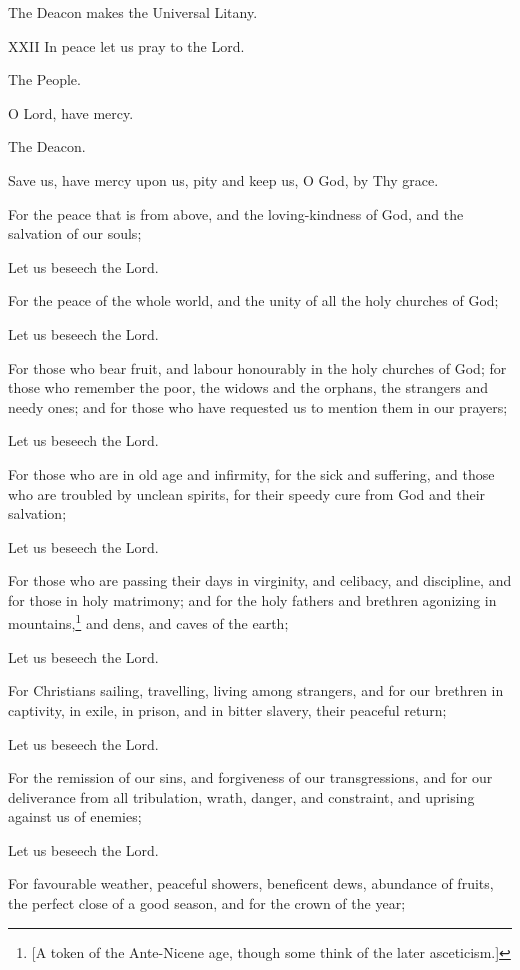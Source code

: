 The Deacon makes the Universal Litany.

\textsc{XXII} In peace let us pray to the Lord.

The People.

O Lord, have mercy.

The Deacon.

Save us, have mercy upon us, pity and keep us, O God, by Thy grace.

For the peace that is from above, and the loving-kindness of God, and the salvation of our souls;

Let us beseech the Lord.

For the peace of the whole world, and the unity of all the holy churches of God;

Let us beseech the Lord.

For those who bear fruit, and labour honourably in the holy churches of God; for those who remember the poor, the widows and the orphans, the strangers and needy ones; and for those who have requested us to mention them in our prayers;

Let us beseech the Lord.

For those who are in old age and infirmity, for the sick and suffering, and those who are troubled by unclean spirits, for their speedy cure from God and their salvation;

Let us beseech the Lord.

For those who are passing their days in virginity, and celibacy, and discipline, and for those in holy matrimony; and for the holy fathers and brethren agonizing in mountains,\footnote{\par{}  [A token of the Ante-Nicene age, though some think of the later asceticism.]} and dens, and caves of the earth;

Let us beseech the Lord.

For Christians sailing, travelling, living among strangers, and for our brethren in captivity, in exile, in prison, and in bitter slavery, their peaceful return;

Let us beseech the Lord.

For the remission of our sins, and forgiveness of our transgressions, and for our deliverance from all tribulation, wrath, danger, and constraint, and uprising against us of enemies;

Let us beseech the Lord.

For favourable weather, peaceful showers, beneficent dews, abundance of fruits, the perfect close of a good season, and for the crown of the year;

